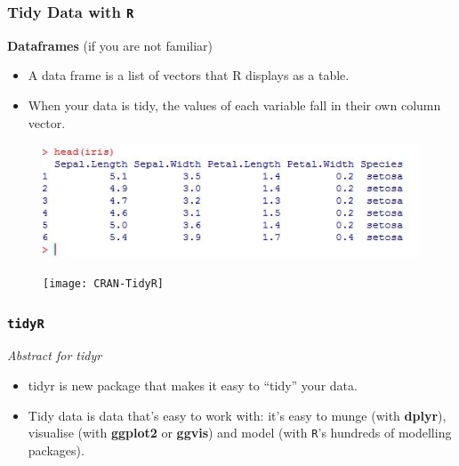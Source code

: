 \documentclass[TIDYMASTER.tex]{subfiles}
\begin{document}
\begin{frame}[fragile]
	\frametitle{Tidy Data with \texttt{R}}
	\Large

	\noindent \textbf{Dataframes} (if you are not familiar)\\
	\begin{itemize}
\item A data frame is a list of vectors that R displays as a table. 
\item When your data is tidy, the values of each variable fall in their own column vector.

	\end{itemize}
	\begin{figure}
\centering
\includegraphics[width=0.7\linewidth]{headiris}

\end{figure}

	\end{frame}
\begin{frame}
\begin{figure}
\centering
\texttt{[image: CRAN-TidyR]}
\end{figure}
\end{frame}	
\begin{frame}
\frametitle{\texttt{tidyR} }
\Large
\vspace{-0.7cm}
\textit{Abstract for tidyr}
\begin{itemize}
\item tidyr is new package that makes it easy to ``tidy” your data. 
\item Tidy data is data that’s easy to work with: it’s easy to munge (with \textbf{dplyr}), 
visualise (with \textbf{ggplot2} or \textbf{ggvis}) and model (with \texttt{R}'s hundreds of modelling packages). 
\end{itemize}
\end{frame}

\end{document}
